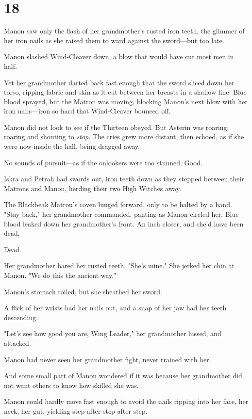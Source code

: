
\chapter{18}

Manon saw only the flash of her grandmother's rusted iron teeth, the glimmer of her iron nails as she raised them to ward against the sword---but too late.

Manon slashed Wind-Cleaver down, a blow that would have cut most men in half.

Yet her grandmother darted back fast enough that the sword sliced down her torso, ripping fabric and skin as it cut between her breasts in a shallow line.
Blue blood sprayed, but the Matron was moving, blocking Manon's next blow with her iron nails---iron so hard that Wind-Cleaver bounced off.

Manon did not look to see if the Thirteen obeyed.
But Asterin was roaring; roaring and shouting to \emph{stop}.
The cries grew more distant, then echoed, as if she were now inside the hall, being dragged away.

No sounds of pursuit---as if the onlookers were too stunned.
Good.

Iskra and Petrah had swords out, iron teeth down as they stepped between their Matrons and Manon, herding their two High Witches away.

The Blackbeak Matron's coven lunged forward, only to be halted by a hand.
"Stay back," her grandmother commanded, panting as Manon circled her.
Blue blood leaked down her grandmother's front.
An inch closer, and she'd have been dead.

Dead.

Her grandmother bared her rusted teeth.
"She's mine."
She jerked her chin at Manon.
"We do this the ancient way."

Manon's stomach roiled, but she sheathed her sword.

A flick of her wrists had her nails out, and a snap of her jaw had her teeth descending.

"Let's see how good you are, Wing Leader," her grandmother hissed, and attacked.

Manon had never seen her grandmother fight, never trained with her.

And some small part of Manon wondered if it was because her grandmother did not want others to know how skilled she was.

Manon could hardly move fast enough to avoid the nails ripping into her face, her neck, her gut, yielding step after step after step.

